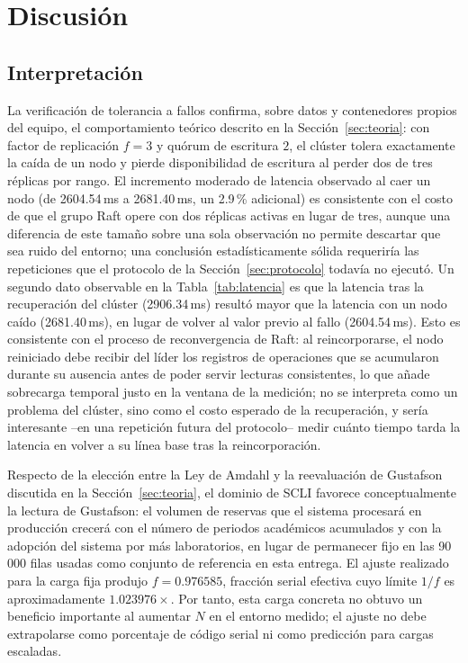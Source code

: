 \documentclass[10pt,twocolumn]{article}
\begin{document}





\section{Discusión}
\label{sec:discusion}

\subsection{Interpretación}

La verificación de tolerancia a fallos confirma, sobre datos y
contenedores propios del equipo, el comportamiento teórico descrito en la
Sección~\ref{sec:teoria}: con factor de replicación $f=3$ y quórum de
escritura $2$, el clúster tolera exactamente la caída de un nodo y pierde
disponibilidad de escritura al perder dos de tres réplicas por rango. El
incremento moderado de latencia observado al caer un nodo (de 2604.54\,ms a
2681.40\,ms, un 2.9\,\% adicional) es consistente con el costo de que el
grupo Raft opere con dos réplicas activas en lugar de tres, aunque una
diferencia de este tamaño sobre una sola observación no permite descartar
que sea ruido del entorno; una conclusión estadísticamente sólida requeriría
las repeticiones que el protocolo de la Sección~\ref{sec:protocolo}
todavía no ejecutó. Un segundo dato observable en la Tabla~\ref{tab:latencia}
es que la latencia tras la recuperación del clúster (2906.34\,ms) resultó
mayor que la latencia con un nodo caído (2681.40\,ms), en lugar de volver
al valor previo al fallo (2604.54\,ms). Esto es consistente con el proceso
de reconvergencia de Raft: al reincorporarse, el nodo reiniciado debe
recibir del líder los registros de operaciones que se acumularon durante su
ausencia antes de poder servir lecturas consistentes, lo que añade
sobrecarga temporal justo en la ventana de la medición; no se interpreta
como un problema del clúster, sino como el costo esperado de la
recuperación, y sería interesante --en una repetición futura del
protocolo-- medir cuánto tiempo tarda la latencia en volver a su línea
base tras la reincorporación.

Respecto de la elección entre la Ley de Amdahl y la reevaluación de
Gustafson discutida en la Sección~\ref{sec:teoria}, el dominio de SCLI
favorece conceptualmente la lectura de Gustafson: el volumen de reservas
que el sistema procesará en producción crecerá con el número de periodos
académicos acumulados y con la adopción del sistema por más laboratorios,
en lugar de permanecer fijo en las 90\,000 filas usadas como conjunto de
referencia en esta entrega. El ajuste realizado para la carga fija produjo
$f=0.976585$, fracción serial efectiva cuyo límite $1/f$ es aproximadamente
$1.023976\times$. Por tanto, esta carga concreta no obtuvo un beneficio
importante al aumentar $N$ en el entorno medido; el ajuste no debe extrapolarse
como porcentaje de código serial ni como predicción para cargas escaladas.
\end{document}
